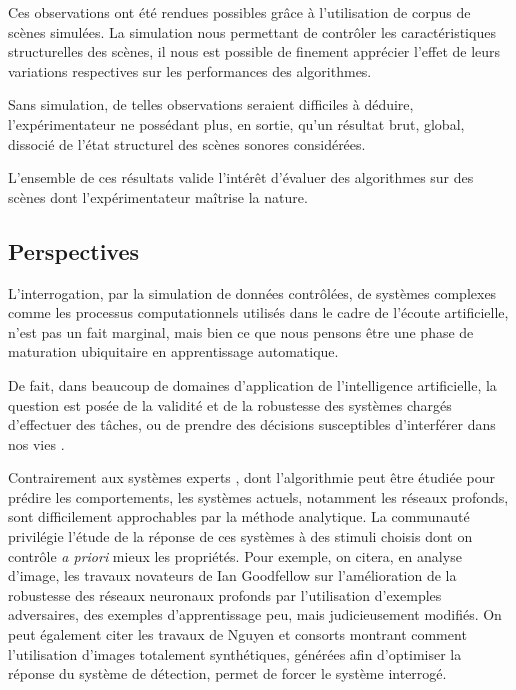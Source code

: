 Ces observations ont été rendues possibles grâce à l'utilisation de corpus de scènes simulées. La simulation nous permettant de contrôler les caractéristiques structurelles des scènes, il nous est possible de finement apprécier l’effet de leurs variations respectives sur les performances des algorithmes.

Sans simulation, de telles observations seraient difficiles à déduire, l’expérimentateur ne possédant plus, en sortie, qu’un résultat brut, global, dissocié de l'état structurel des scènes sonores considérées.

L'ensemble de ces résultats valide l'intérêt d'évaluer des algorithmes sur des scènes dont l'expérimentateur maîtrise la nature.

\subsection{Perspectives}

L'interrogation, par la simulation de données contrôlées, de systèmes complexes comme les processus computationnels utilisés dans le cadre de l’écoute artificielle, n’est pas un fait marginal, mais bien ce que nous pensons être une phase de maturation ubiquitaire en apprentissage automatique.

De fait, dans beaucoup de domaines d'application de l'intelligence artificielle, la question est posée de la validité et de la robustesse des systèmes chargés d'effectuer des tâches, ou de prendre des décisions susceptibles d'interférer dans nos vies \citep{o2016weapons}.

Contrairement aux systèmes experts \citep{Leondes2002xxiii}, dont l'algorithmie peut être étudiée pour prédire les comportements, les systèmes actuels, notamment les réseaux profonds, sont difficilement approchables par la méthode analytique. La communauté privilégie l'étude de la réponse de ces systèmes à des stimuli choisis dont on contrôle \emph{a priori} mieux les propriétés. Pour exemple, on citera, en analyse d'image, les travaux novateurs de Ian Goodfellow \citep{goodfellow2014explaining} sur l'amélioration de la robustesse des réseaux neuronaux profonds par l'utilisation d’exemples adversaires, des exemples d'apprentissage peu, mais judicieusement modifiés. On peut également citer les travaux de Nguyen et consorts \citep{nguyen2015deep} montrant comment l'utilisation d'images totalement synthétiques, générées afin d'optimiser la réponse du système de détection, permet de forcer le système interrogé.

